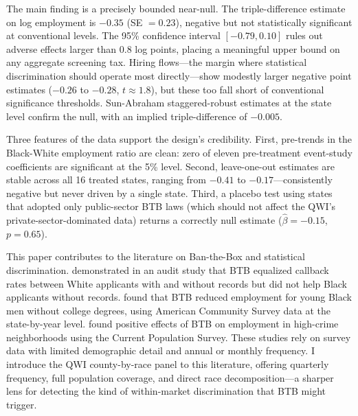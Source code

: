 \documentclass[12pt]{article}
\begin{document}
The main finding is a precisely bounded near-null. The triple-difference estimate on log employment is $-0.35$ (SE $= 0.23$), negative but not statistically significant at conventional levels. The 95\% confidence interval $[-0.79, 0.10]$ rules out adverse effects larger than 0.8 log points, placing a meaningful upper bound on any aggregate screening tax. Hiring flows---the margin where statistical discrimination should operate most directly---show modestly larger negative point estimates ($-0.26$ to $-0.28$, $t \approx 1.8$), but these too fall short of conventional significance thresholds. Sun-Abraham staggered-robust estimates at the state level confirm the null, with an implied triple-difference of $-0.005$.

Three features of the data support the design's credibility. First, pre-trends in the Black-White employment ratio are clean: zero of eleven pre-treatment event-study coefficients are significant at the 5\% level. Second, leave-one-out estimates are stable across all 16 treated states, ranging from $-0.41$ to $-0.17$---consistently negative but never driven by a single state. Third, a placebo test using states that adopted only public-sector BTB laws (which should not affect the QWI's private-sector-dominated data) returns a correctly null estimate ($\hat{\beta} = -0.15$, $p = 0.65$).

This paper contributes to the literature on Ban-the-Box and statistical discrimination. \citet{agan2018} demonstrated in an audit study that BTB equalized callback rates between White applicants with and without records but did not help Black applicants without records. \citet{doleac2020} found that BTB reduced employment for young Black men without college degrees, using American Community Survey data at the state-by-year level. \citet{shoag2020} found positive effects of BTB on employment in high-crime neighborhoods using the Current Population Survey. These studies rely on survey data with limited demographic detail and annual or monthly frequency. I introduce the QWI county-by-race panel to this literature, offering quarterly frequency, full population coverage, and direct race decomposition---a sharper lens for detecting the kind of within-market discrimination that BTB might trigger.
\end{document}
